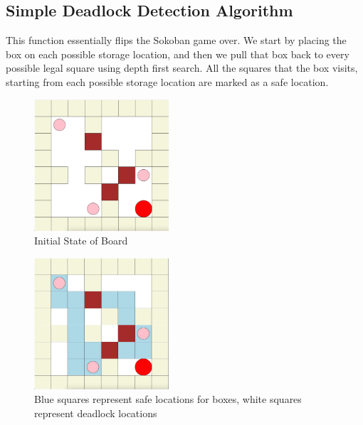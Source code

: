 \documentclass{article}
\begin{document}
\subsection{Simple Deadlock Detection Algorithm}
This function essentially flips the Sokoban game over. We start by placing the box on each possible storage location, and then we pull that box back to every possible legal square using depth first search. All the squares that the box visits, starting from each possible storage location are marked as a safe location.
\begin{figure}[htp]
        \centering
        \includegraphics[width=5cm]{Board.png}
        \caption{Initial State of Board}
\end{figure} 
\begin{figure}[htp]
        \centering
        \includegraphics[width=5cm]{Deadlock.png}
        \caption{Blue squares represent safe locations for boxes, white squares represent deadlock locations}
\end{figure} 
\end{document}
